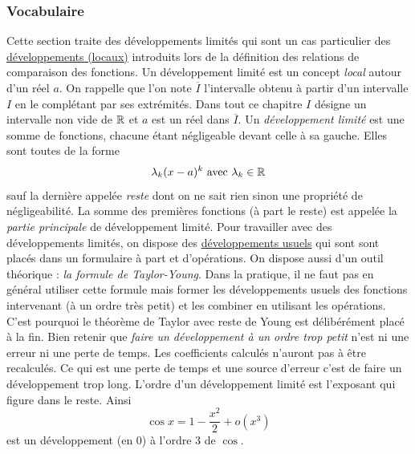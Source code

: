 \subsubsection{Vocabulaire}
Cette section traite des développements limités qui sont un cas particulier des \href{\baseurl C2064.pdf}{développements (locaux)} introduits lors de la définition des relations de comparaison des fonctions.\newline
Un développement limité est un concept \emph{local} autour d'un réel $a$. On rappelle que l'on note $\overline{I}$ l'intervalle obtenu à partir d'un intervalle $I$ en le complétant par ses extrémités. Dans tout ce chapitre $I$ désigne un intervalle non vide de $\mathbb{R}$ et $a$ est un réel dans $\overline{I}$.\newline
Un \emph{développement limité} est une somme de fonctions, chacune étant négligeable devant celle à sa gauche. Elles sont toutes de la forme
\begin{displaymath}
 \lambda_k (x-a)^k \text{ avec } \lambda_k\in\mathbb{R}
\end{displaymath}
sauf la dernière appelée \emph{reste} dont on ne sait rien sinon une propriété de négligeabilité. La somme des premières fonctions (à part le reste) est appelée la \emph{partie principale} de développement limité.\newline
Pour travailler avec des développements limités, on dispose des \href{\baseurl C5904.pdf}{développements usuels} qui sont sont placés dans un formulaire à part et d'opérations.\newline
On dispose aussi d'un outil théorique : \emph{la formule de Taylor-Young}. Dans la pratique, il ne faut pas en général utiliser cette formule mais former les développements usuels des fonctions intervenant (à un ordre très petit) et les combiner en utilisant les opérations. C'est pourquoi le théorème de Taylor avec reste de Young est délibérément placé à la fin.\newline
Bien retenir que \emph{faire un développement à un ordre trop petit} n'est ni une erreur ni une perte de temps. Les coefficients calculés n'auront pas à être recalculés. Ce qui est une perte de temps et une source d'erreur c'est de faire un développement trop long.
\newline
L'ordre d'un développement limité est l'exposant qui figure dans le reste. Ainsi
\begin{displaymath}
 \cos x = 1- \frac{x^2}{2}+o(x^3)
\end{displaymath}
est un développement (en $0$) à l'ordre $3$ de $\cos$.

